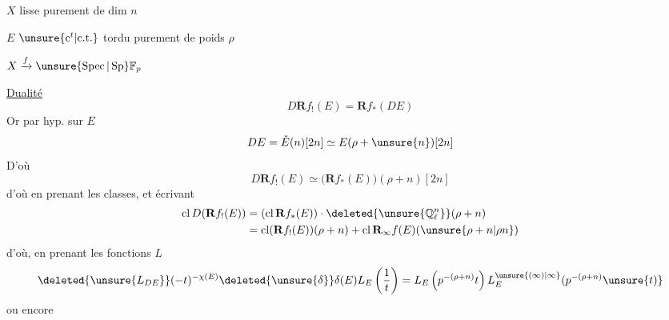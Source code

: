 $X$ lisse purement de dim $n$

$E$ $\unsure{\mathrm c^t|\mathrm{c.t.}}$ tordu purement de poids $\rho$

$X\xrightarrow{f}\unsure{\operatorname{Spec}|\operatorname{Sp}}\mathbb F_p$ 

\uline{Dualité}
\[D\mathbf R f_!(E)=\mathbf R f_*(DE)\]
Or par hyp. sur $E$
\[DE=\check E(n)[2n]\simeq E(\rho+\unsure{n})[2n]\]
D'où
\[D\mathbf R f_!(E)\simeq\bigl(\mathbf R f_*(E)\bigr)(\rho+n)[2n]\]
d'où en prenant les classes, et écrivant
\[
\begin{aligned}
\operatorname{cl}D(\mathbf R f_!(E))&=(\operatorname{cl}\mathbf R f_*(E))\cdot\deleted{\unsure{\mathbb Q_\ell^n}}(\rho+n)\\
&=\operatorname{cl}(\mathbf R f_!(E))(\rho+n)+\operatorname{cl}\mathbf R_\infty f(E)(\unsure{\rho+n|\rho n})
\end{aligned}
\]
d'où, en prenant les fonctions $L$
\[
\deleted{\unsure{L_{DE}}}(-t)^{-\chi(E)}\deleted{\unsure{\delta}}\delta(E)L_E\left(\frac1t\right)=L_E\left(p^{-(\rho+n)}t\right)L_E^{\unsure{(\infty)|\infty}}(p^{-(\rho+n)}\unsure{t)}
\]
ou encore
